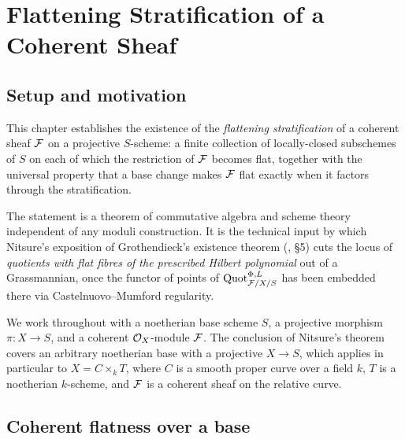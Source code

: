 \chapter{Flattening Stratification of a Coherent Sheaf}
\label{chap:Picard_FlatteningStratification}

\section{Setup and motivation}
\label{sec:flatstrat_setup}

This chapter establishes the existence of the \emph{flattening stratification} of
a coherent sheaf \(\mathcal{F}\) on a projective \(S\)-scheme: a finite collection of
locally-closed subschemes of \(S\) on each of which the restriction of \(\mathcal{F}\)
becomes flat, together with the universal property that a base change makes
\(\mathcal{F}\) flat exactly when it factors through the stratification.

The statement is a theorem of commutative algebra and scheme theory
independent of any moduli construction.  It is the technical input by which
Nitsure's exposition of Grothendieck's existence theorem
(\cite{nitsure-hilbert-quot}, \S5) cuts the locus of \emph{quotients with flat
fibres of the prescribed Hilbert polynomial} out of a Grassmannian, once the
functor of points of \(\operatorname{Quot}_{\mathcal{F}/X/S}^{\Phi,L}\) has been embedded there via
Castelnuovo--Mumford regularity.

We work throughout with a noetherian base scheme \(S\), a projective morphism
\(\pi : X \to S\), and a coherent \(\mathcal{O}_X\)-module \(\mathcal{F}\). The conclusion of Nitsure's
theorem covers an arbitrary noetherian base with a projective \(X \to S\), which
applies in particular to \(X = C \times_k T\), where \(C\) is a smooth proper
curve over a field \(k\), \(T\) is a noetherian \(k\)-scheme, and \(\mathcal{F}\) is a
coherent sheaf on the relative curve.

\section{Coherent flatness over a base}
\label{sec:coh_flat}

